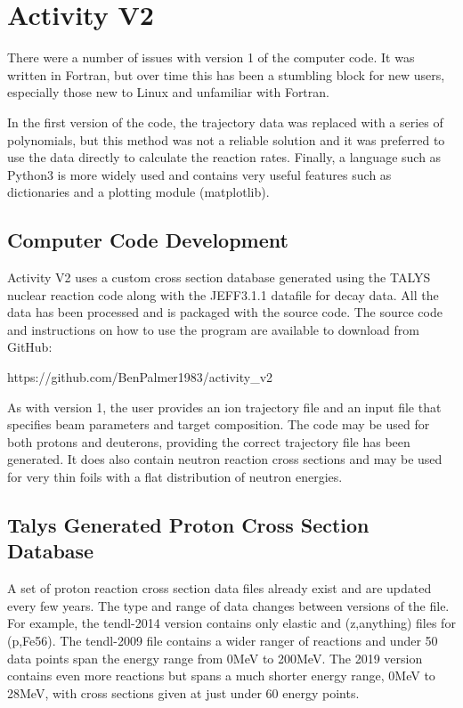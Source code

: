 \FloatBarrier
\section{Activity V2}

There were a number of issues with version 1 of the computer code.  It was written in Fortran, but over time this has been a stumbling block for new users, especially those new to Linux and unfamiliar with Fortran. 

In the first version of the code, the trajectory data was replaced with a series of polynomials, but this method was not a reliable solution and it was preferred to use the data directly to calculate the reaction rates.  Finally, a language such as Python3 is more widely used and contains very useful features such as dictionaries and a plotting module (matplotlib).

\subsection{Computer Code Development}

Activity V2 uses a custom cross section database generated using the TALYS nuclear reaction code along with the JEFF3.1.1 datafile for decay data.  All the data has been processed and is packaged with the source code.  The source code and instructions on how to use the program are available to download from GitHub: 

https://github.com/BenPalmer1983/activity\_v2

As with version 1, the user provides an ion trajectory file and an input file that specifies beam parameters and target composition.  The code may be used for both protons and deuterons, providing the correct trajectory file has been generated.  It does also contain neutron reaction cross sections and may be used for very thin foils with a flat distribution of neutron energies.


\subsection{Talys Generated Proton Cross Section Database}
\label{section:activitytalysdb}

A set of proton reaction cross section data files already exist and are updated every few years.  The type and range of data changes between versions of the file.  For example, the \acrshort{tendl}-2014 version contains only elastic and (z,anything) files for (p,Fe56).  The \acrshort{tendl}-2009 file contains a wider ranger of reactions and under 50 data points span the energy range from 0MeV to 200MeV.  The 2019 version contains even more reactions but spans a much shorter energy range, 0MeV to 28MeV, with cross sections given at just under 60 energy points.

